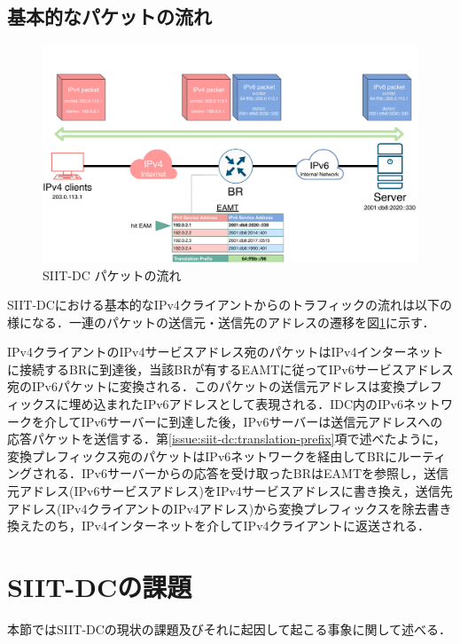 \subsection{基本的なパケットの流れ}
\label{issue:siit-dc:packet_flow}

\begin{figure}[h]
    \begin{center}
      \includegraphics[width=14cm,pagebox=cropbox,clip]{img/siit-dc_packet.pdf}
    \end{center}
    \caption{SIIT-DC パケットの流れ}
    \label{fig:siit-dc_packet}
\end{figure}

SIIT-DCにおける基本的なIPv4クライアントからのトラフィックの流れは以下の様になる．一連のパケットの送信元・送信先のアドレスの遷移を図\ref{fig:siit-dc_packet}に示す．

IPv4クライアントのIPv4サービスアドレス宛のパケットはIPv4インターネットに接続するBRに到達後，当該BRが有するEAMTに従ってIPv6サービスアドレス宛のIPv6パケットに変換される．このパケットの送信元アドレスは変換プレフィックスに埋め込まれたIPv6アドレスとして表現される．IDC内のIPv6ネットワークを介してIPv6サーバーに到達した後，IPv6サーバーは送信元アドレスへの応答パケットを送信する．第\ref{issue:siit-dc:translation-prefix}項で述べたように，変換プレフィックス宛のパケットはIPv6ネットワークを経由してBRにルーティングされる．IPv6サーバーからの応答を受け取ったBRはEAMTを参照し，送信元アドレス(IPv6サービスアドレス)をIPv4サービスアドレスに書き換え，送信先アドレス(IPv4クライアントのIPv4アドレス)から変換プレフィックスを除去書き換えたのち，IPv4インターネットを介してIPv4クライアントに返送される．




\section{SIIT-DCの課題}
\label{issue:siit-dc_problems}
本節ではSIIT-DCの現状の課題及びそれに起因して起こる事象に関して述べる．

